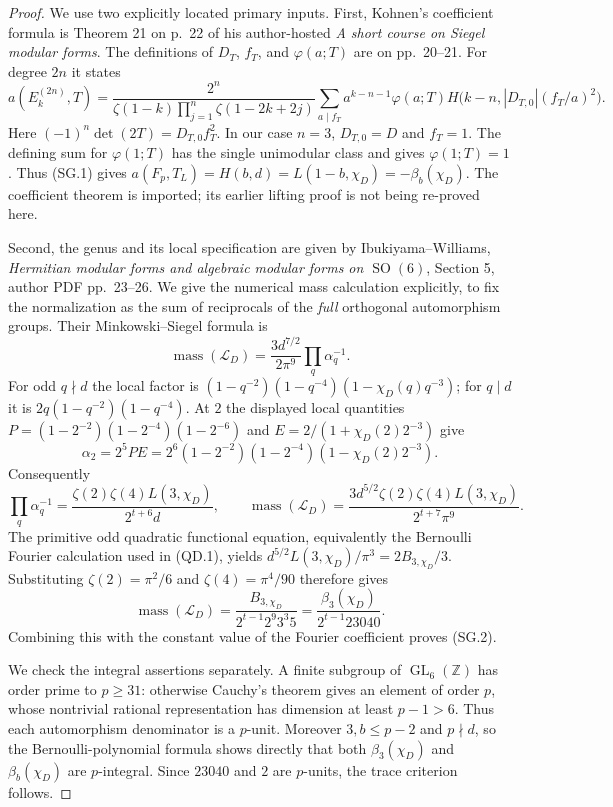 \begin{proof}
We use two explicitly located primary inputs.  First, Kohnen's
coefficient formula is Theorem 21 on p.~22 of his author-hosted
\emph{A short course on Siegel modular forms}.  The definitions of
$D_T$, $f_T$, and $\varphi(a;T)$ are on pp.~20--21.
For degree $2n$ it states
\[
 a(E_k^{(2n)},T)=
 \frac{2^n}{\zeta(1-k)\prod_{j=1}^n\zeta(1-2k+2j)}
 \sum_{a\mid f_T}a^{k-n-1}\varphi(a;T)
 H\bigl(k-n,|D_{T,0}|(f_T/a)^2\bigr).
\]
Here $(-1)^n\det(2T)=D_{T,0}f_T^2$.  In our case $n=3$,
$D_{T,0}=D$ and $f_T=1$.  The defining sum for $\varphi(1;T)$
has the single unimodular class and gives $\varphi(1;T)=1$.
Thus (SG.1) gives
$a(F_p,T_L)=H(b,d)=L(1-b,\chi_D)=-\beta_b(\chi_D)$.
The coefficient theorem is imported; its earlier lifting proof is not
being re-proved here.

Second, the genus and its local specification are given by
Ibukiyama--Williams, \emph{Hermitian modular forms and algebraic
modular forms on $\operatorname{SO}(6)$}, Section 5, author PDF
pp.~23--26.  We give the numerical mass calculation explicitly, to
fix the normalization as the sum of reciprocals of the \emph{full}
orthogonal automorphism groups.  Their Minkowski--Siegel formula is
\[
 \operatorname{mass}(\mathcal L_D)
   =\frac{3d^{7/2}}{2\pi^9}\prod_q\alpha_q^{-1}.
\]
For odd $q\nmid d$ the local factor is
$(1-q^{-2})(1-q^{-4})(1-\chi_D(q)q^{-3})$; for $q\mid d$ it is
$2q(1-q^{-2})(1-q^{-4})$.  At $2$ the displayed local quantities
$P=(1-2^{-2})(1-2^{-4})(1-2^{-6})$ and
$E=2/(1+\chi_D(2)2^{-3})$ give
\[
 \alpha_2=2^5PE
 =2^6(1-2^{-2})(1-2^{-4})(1-\chi_D(2)2^{-3}).
\]
Consequently
\[
 \prod_q\alpha_q^{-1}
   =\frac{\zeta(2)\zeta(4)L(3,\chi_D)}{2^{t+6}d},
 \qquad
 \operatorname{mass}(\mathcal L_D)
   =\frac{3d^{5/2}\zeta(2)\zeta(4)L(3,\chi_D)}
                         {2^{t+7}\pi^9}.
\]
The primitive odd quadratic functional equation, equivalently the
Bernoulli Fourier calculation used in (QD.1), yields
$d^{5/2}L(3,\chi_D)/\pi^3=2B_{3,\chi_D}/3$.
Substituting $\zeta(2)=\pi^2/6$ and
$\zeta(4)=\pi^4/90$ therefore gives
\begin{equation}
 \operatorname{mass}(\mathcal L_D)
   =\frac{B_{3,\chi_D}}{2^{t-1}2^9 3^3 5}
   =\frac{\beta_3(\chi_D)}{2^{t-1}23040}.
 \tag{SG.3}
\end{equation}
Combining this with the constant value of the Fourier coefficient
proves (SG.2).

We check the integral assertions separately.  A finite subgroup of
$\operatorname{GL}_6(\mathbb Z)$ has order prime to $p\geq31$:
otherwise Cauchy's theorem gives an element of order $p$, whose
nontrivial rational representation has dimension at least $p-1>6$.
Thus each automorphism denominator is a $p$-unit.  Moreover
$3,b\leq p-2$ and $p\nmid d$, so the Bernoulli-polynomial formula
shows directly that both $\beta_3(\chi_D)$ and $\beta_b(\chi_D)$
are $p$-integral.  Since $23040$ and $2$ are $p$-units, the trace
criterion follows.


\end{proof}
